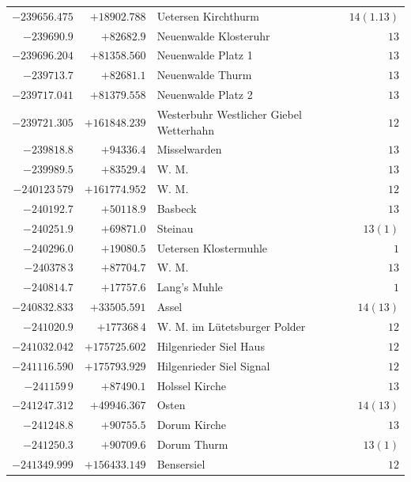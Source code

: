 \begin{center}
\begin{tabular}{r|r|p{170pt}|r}
\(-239656.475\)&\(+18902.788\)&Uetersen Kirchthurm&\(14(1.13)\)\\
\(-239690.9\)&\(+82682.9\)&Neuenwalde Klosteruhr&\(13\)\\
\(-239696.204\)&\(+81358.560\)&Neuenwalde Platz 1&\(13\)\\
\(-239713.7\)&\(+82681.1\)&Neuenwalde Thurm&\(13\)\\
\(-239717.041\)&\(+81379.558\)&Neuenwalde Platz 2&\(13\)\\
\(-239721.305\)&\(+161848.239\)&Westerbuhr Westlicher Giebel Wetterhahn&\(12\)\\
\(-239818.8\)&\(+94336.4\)&Misselwarden&\(13\)\\
\(-239989.5\)&\(+83529.4\)&W. M.&\(13\)\\
\(-240123\,579\)&\(+161774.952\)&W. M.&\(12\)\\
\(-240192.7\)&\(+50118.9\)&Basbeck&\(13\)\\
\(-240251.9\)&\(+69871.0\)&Steinau&\(13(1)\)\\
\(-240296.0\)&\(+19080.5\)&Uetersen Klostermuhle&\(1\)\\
\(-240378\,3\)&\(+87704.7\)&W. M.&\(13\)\\
\(-240814.7\)&\(+17757.6\)&Lang’s Muhle&\(1\)\\
\(-240832.833\)&\(+33505.591\)&Assel&\(14(13)\)\\
\(-241020.9\)&\(+177368\,4\)&W. M. im Lütetsburger Polder&\(12\)\\
\(-241032.042\)&\(+175725.602\)&Hilgenrieder Siel Haus&\(12\)\\
\(-241116.590\)&\(+175793.929\)&Hilgenrieder Siel Signal&\(12\)\\
\(-241159\,9\)&\(+87490.1\)&Holssel Kirche&\(13\)\\
\(-241247.312\)&\(+49946.367\)&Osten&\(14(13)\)\\
\(-241248.8\)&\(+90755.5\)&Dorum Kirche&\(13\)\\
\(-241250.3\)&\(+90709.6\)&Dorum Thurm&\(13(1)\)\\
\(-241349.999\)&\(+156433.149\)&Bensersiel&\(12\)\\
\hline\end{tabular}\endgroup\end{center}
\clearpage
